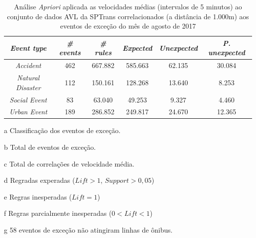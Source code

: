 \documentclass[
	12pt,				%
	oneside,			%
	a4paper,			%
	english,			%
	brazil				%
	]{abntex2ppgsi}
\begin{document}
{{\begin{apendicesenv}
\begin{table}[!htb]
\centering
\begin{threeparttable}
\caption {Análise \textit{Apriori} aplicada as velocidades médias (intervalos de 5 minutos) ao conjunto de dados AVL da SPTrans correlacionados (a distância de 1.000m) aos eventos de exceção do mês de agosto de 2017}
\label {tab:aprioriFull}
\begin{tabular}{c|c|c|c|c|c}
\hline
\textbf{\textit{Event type}}\tnote{a} & \textbf{\textit{\# events}}\tnote{b} & \textit{\textbf{\# rules}}\tnote{c} & \textbf{\textit{Expected}}\tnote{d} & \textbf{\textit{Unexpected}}\tnote{e} & \textbf{\textit{P. unexpected}}\tnote{f}   \\
\hline
\textit{Accident} & 462 &  667.882 & 585.663 & 62.135 & 30.084\\
\textit{Natural Disaster} & 112 & 150.161 & 128.268  & 13.640 & 8.253\\
\textit{Social Event} & 83 & 63.040 & 49.253 & 9.327 & 4.460	  \\
\textit{Urban Event} & 189 & 286.852 & 249.817 & 24.670 & 12.365 \\
\hline
\end{tabular}
\begin{tablenotes}
            \item[a] Classificação dos eventos de exceção.
            \item[b] Total de eventos de exceção.
            \item[c] Total de correlações de velocidade média.
            \item[d] Regradas experadas ($Lift > 1$, $Support > 0,05$)
            \item[e] Regras inesperadas ($Lift = 1$)
            \item[f] Regras parcialmente inesperadas ($0 < Lift < 1$)
            \item[g] 58 eventos de exceção não atingiram linhas de ônibus.
        \end{tablenotes}
\end{threeparttable}
\end{table}


\end{apendicesenv}}}
\end{document}
